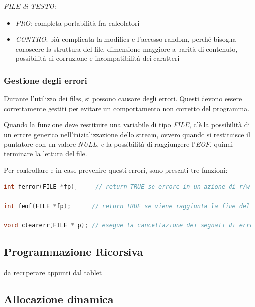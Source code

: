 \documentclass[
  paper=a4,
  oneside  ,captions=tableheading
]{scrbook}
\providecommand{\tightlist}{%
  \setlength{\itemsep}{0pt}\setlength{\parskip}{0pt}}
\begin{document}
\emph{FILE di TESTO:}

\begin{itemize}
\tightlist
\item
  \emph{PRO}: completa portabilità fra calcolatori
\item
  \emph{CONTRO}: più complicata la modifica e l'accesso random, perché
  bisogna conoscere la struttura del file, dimensione maggiore a parità
  di contenuto, possibilità di corruzione e incompatibilità dei
  caratteri
\end{itemize}

\hypertarget{gestione-degli-errori}{%
\subsubsection{Gestione degli errori}\label{gestione-degli-errori}}

Durante l'utilizzo dei files, si possono causare degli errori. Questi
devono essere correttamente gestiti per evitare un comportamento non
corretto del programma.

Quando la funzione deve restituire una variabile di tipo \emph{FILE},
c'è la possibilità di un errore generico nell'inizializzazione dello
stream, ovvero quando si restituisce il puntatore con un valore
\emph{NULL}, e la possibilità di raggiungere l'\emph{EOF}, quindi
terminare la lettura del file.

Per controllare e in caso prevenire questi errori, sono presenti tre
funzioni:

\begin{lstlisting}[language=C]
int ferror(FILE *fp);     // return TRUE se errore in un azione di r/w

int feof(FILE *fp);      // return TRUE se viene raggiunta la fine del file

void clearerr(FILE *fp); // esegue la cancellazione dei segnali di errore
\end{lstlisting}

\hypertarget{programmazione-ricorsiva}{%
\subsection{Programmazione Ricorsiva}\label{programmazione-ricorsiva}}

da recuperare appunti dal tablet

\hypertarget{allocazione-dinamica}{%
\subsection{Allocazione dinamica}\label{allocazione-dinamica}}
\end{document}
